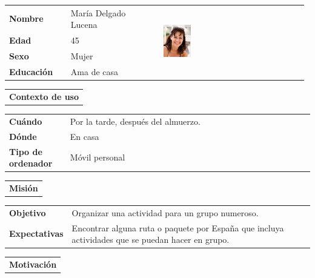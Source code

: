 \documentclass[11pt]{article}
\begin{document}
\begin{table}[H]
	\centering
	\begin{tabular}{p{0.2\linewidth}|p{0.3\linewidth}p{0.475\linewidth}}
		\toprule
		\textbf{Nombre} & María Delgado Lucena &\multirow{4}{*}{\begin{minipage}{1.\textwidth}\includegraphics[width=0.2\textwidth, height=30mm]{Maria}\end{minipage}}\\
		\textbf{Edad} & 45 & \\
		\textbf{Sexo} & Mujer & \\
		\textbf{Educación} & Ama de casa & \\
		\bottomrule
	\end{tabular}
	
	\begin{tabular}{l}
		\textbf{Contexto de uso} 
	\end{tabular}
	
	\begin{tabular}{p{0.2\linewidth}|p{0.8\linewidth}}
		\toprule
		\textbf{Cuándo} & Por la tarde, después del almuerzo. \\
		\textbf{Dónde}  & En casa\\
		\textbf{Tipo de ordenador} & Móvil personal\\
		\bottomrule
	\end{tabular}
	
	\begin{tabular}{l}
		\textbf{Misión} 
	\end{tabular}
	
	\begin{tabular}{p{0.2\linewidth}|p{0.8\linewidth}}
		\toprule
		\textbf{Objetivo} & Organizar una actividad para un grupo numeroso.\\
		\textbf{Expectativas}  & Encontrar alguna ruta o paquete por España que incluya actividades que se puedan hacer en grupo. \\
		\bottomrule
	\end{tabular}
	
	\begin{tabular}{l}
		\textbf{Motivación} 
	\end{tabular}
	

\end{table}
\end{document}
